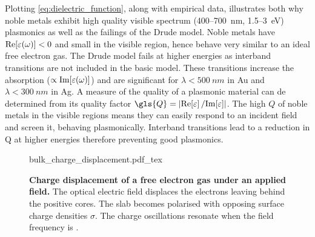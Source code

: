 \documentclass{article}
\begin{document}
Plotting \eqref{eq:dielectric_function}, along with empirical data, illustrates both why noble metals exhibit high quality visible spectrum (400--\SI{700}{nm}, 1.5--\SI{3}{eV}) plasmonics as well as the failings of the Drude model. Noble metals have $\mathrm{Re}\!\left[{\varepsilon(\omega)}\right]<0$ and small \imag{\dielectric} in the visible region, hence behave very similar to an ideal free electron gas. The Drude model fails at higher energies as interband transitions are not included in the basic model. These transitions increase the absorption ($\propto\mathrm{Im}\!\left[{\varepsilon(\omega)}\right]$) and are significant for $\lambda < \SI{500}{nm}$ in Au and $\lambda<\SI{300}{nm}$ in Ag. A measure of the quality of a plasmonic material can de determined from its quality factor $\gls{Q} = \left|\real{\eps}/\imag{\eps}\right|$. The high $Q$ of noble metals in the visible regions means they can easily respond to an incident field and screen it, behaving plasmonically. Interband transitions lead to a reduction in \gls{Q} at higher energies therefore preventing good plasmonics.

\begin{figure}[bt]
\centering
\fontsize{10pt}{1em}\selectfont
{bulk_charge_displacement.pdf_tex}
\caption[Charge displacement of a free electron gas under an applied field]{\textbf{Charge displacement of a free electron gas under an applied field.} The optical electric field displaces the electrons leaving behind the positive cores. The slab becomes polarised with opposing surface charge densities $\sigma$. The charge oscillations resonate when the field frequency is \omegap.}
\label{fig:bulk_charge_displacement}
\end{figure}
\end{document}
